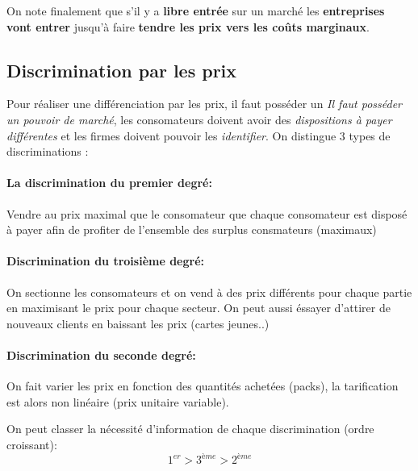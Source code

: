 On note finalement que s'il y a \textbf{libre entrée} sur un marché les \textbf{entreprises vont entrer} jusqu'à faire \textbf{tendre les prix vers les coûts marginaux}.

\subsection{Discrimination par les prix} %
\label{sub:discrimination_par_les_prix}
 Pour réaliser une différenciation par les prix, il faut posséder un \emph{Il faut posséder un pouvoir de marché}, les consomateurs doivent avoir des \emph{dispositions à payer différentes} et les firmes doivent pouvoir les \emph{identifier}. On distingue 3 types de discriminations : 
 
 \paragraph{La discrimination du premier degré:} %
 \label{par:la_discrimination_du_premier_degre}
 
 Vendre au prix maximal que le consomateur que chaque consomateur est disposé à payer afin de profiter de l'ensemble des surplus consmateurs (maximaux) 
 
 
\paragraph{Discrimination du troisième degré:} %
\label{par:discrimination_du_troisieme_degre}
On sectionne les consomateurs et on vend à des prix différents pour chaque partie en maximisant le prix pour chaque secteur. On peut aussi éssayer d'attirer de nouveaux clients en baissant les prix (cartes jeunes..)

\paragraph{Discrimination du seconde degré:} %
\label{par:discrimination_du_seconde_degre}
On fait varier les prix en fonction des quantités achetées (packs), la tarification est alors non linéaire (prix unitaire variable).



On peut classer la nécessité d'information de chaque discrimination (ordre croissant):
\[
	1^{er} > 3^{ème} > 2^{ème}
\]

